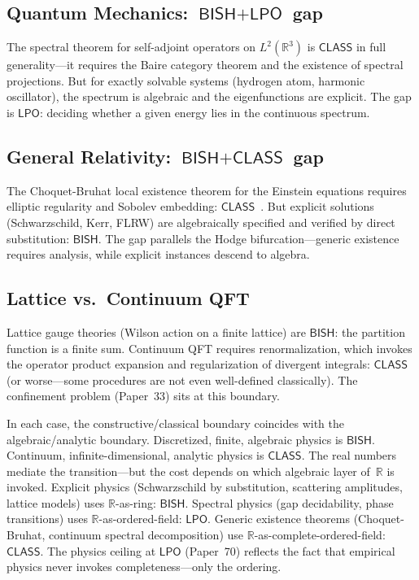 \documentclass[11pt,a4paper]{article}
\theoremstyle{plain}
\theoremstyle{definition}
\newcommand{\BISH}{\textsf{BISH}}
\newcommand{\LPO}{\textsf{LPO}}
\newcommand{\CLASS}{\textsf{CLASS}}
\newcommand{\R}{\mathbb{R}}
\begin{document}
\subsection{Quantum Mechanics: $\BISH + \LPO$ gap}

The spectral theorem for self-adjoint operators on $L^2(\R^3)$ is $\CLASS$ in full generality---it requires the Baire category theorem and the existence of spectral projections. But for exactly solvable systems (hydrogen atom, harmonic oscillator), the spectrum is algebraic and the eigenfunctions are explicit. The gap is $\LPO$: deciding whether a given energy lies in the continuous spectrum.

\subsection{General Relativity: $\BISH + \CLASS$ gap}

The Choquet-Bruhat local existence theorem for the Einstein equations requires elliptic regularity and Sobolev embedding: $\CLASS$~\cite{choquet-bruhat52}. But explicit solutions (Schwarzschild, Kerr, FLRW) are algebraically specified and verified by direct substitution: $\BISH$. The gap parallels the Hodge bifurcation---generic existence requires analysis, while explicit instances descend to algebra.

\subsection{Lattice vs.\ Continuum QFT}

Lattice gauge theories (Wilson action on a finite lattice) are $\BISH$: the partition function is a finite sum. Continuum QFT requires renormalization, which invokes the operator product expansion and regularization of divergent integrals: $\CLASS$ (or worse---some procedures are not even well-defined classically). The confinement problem (Paper~33) sits at this boundary.

\medskip

In each case, the constructive/classical boundary coincides with the algebraic/analytic boundary. Discretized, finite, algebraic physics is $\BISH$. Continuum, infinite-dimensional, analytic physics is $\CLASS$. The real numbers mediate the transition---but the cost depends on which algebraic layer of~$\R$ is invoked. Explicit physics (Schwarzschild by substitution, scattering amplitudes, lattice models) uses $\R$-as-ring: $\BISH$. Spectral physics (gap decidability, phase transitions) uses $\R$-as-ordered-field: $\LPO$. Generic existence theorems (Choquet-Bruhat, continuum spectral decomposition) use $\R$-as-complete-ordered-field: $\CLASS$. The physics ceiling at $\LPO$ (Paper~70) reflects the fact that empirical physics never invokes completeness---only the ordering.
\end{document}
